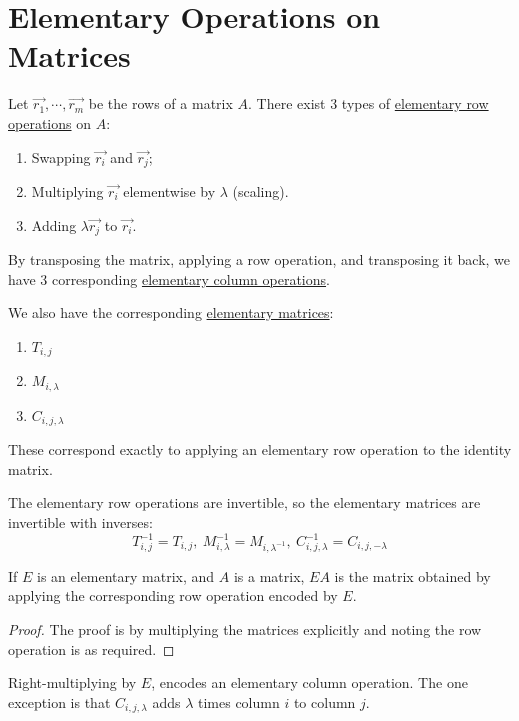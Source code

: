 \documentclass[../Main.tex]{subfiles}
\begin{document}
\section{Elementary Operations on Matrices}
Let $\vec{r_1}, \cdots, \vec{r_m}$ be the rows of a matrix $A$. There exist 3 types of \underline{elementary row operations} on $A$:
\begin{enumerate}
    \item Swapping $\vec{r_i}$ and $\vec{r_j}$;
    \item Multiplying $\vec{r_i}$ elementwise by $\lambda$ (scaling).
    \item Adding $\lambda \vec{r_j}$ to $\vec{r_i}$.
\end{enumerate}
\begin{remark}
    By transposing the matrix, applying a row operation, and transposing it back, we have 3 corresponding \underline{elementary column operations}.
\end{remark}
We also have the corresponding \underline{elementary matrices}:
\begin{enumerate}
    \item $T_{i,j}$
    \item $M_{i, \lambda}$
    \item $C_{i, j, \lambda}$
\end{enumerate}
\begin{remarks}
    \item These correspond exactly to applying an elementary row operation to the identity matrix.
    \item The elementary row operations are invertible, so the elementary matrices are invertible with inverses:
    \begin{equation*}
        T_{i,j}^{-1} = T_{i,j},~M_{i, \lambda}^{-1} = M_{i, \lambda^{-1}},~C_{i, j, \lambda}^{-1} = C_{i, j, -\lambda}
    \end{equation*}
\end{remarks}
\begin{lemma}
    If $E$ is an elementary matrix, and $A$ is a matrix, $EA$ is the matrix obtained by applying the corresponding row operation encoded by $E$.
    \label{lemMatAndRowOP}
\end{lemma}
\begin{proof}
    The proof is by multiplying the matrices explicitly and noting the row operation is as required.
\end{proof}
\begin{remark}
    Right-multiplying by $E$, encodes an elementary column operation. The one exception is that $C_{i, j, \lambda}$ adds $\lambda$ times column $i$ to column $j$.
\end{remark}
\end{document}
